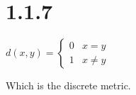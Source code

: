 \documentclass{article}
\begin{document}
\section*{1.1.7}

$d(x,y) = \begin{cases}
  0 & x=y \\
  1 & x\not=y
\end{cases}$
\newline

\noindent
Which is the discrete metric.
\end{document}
